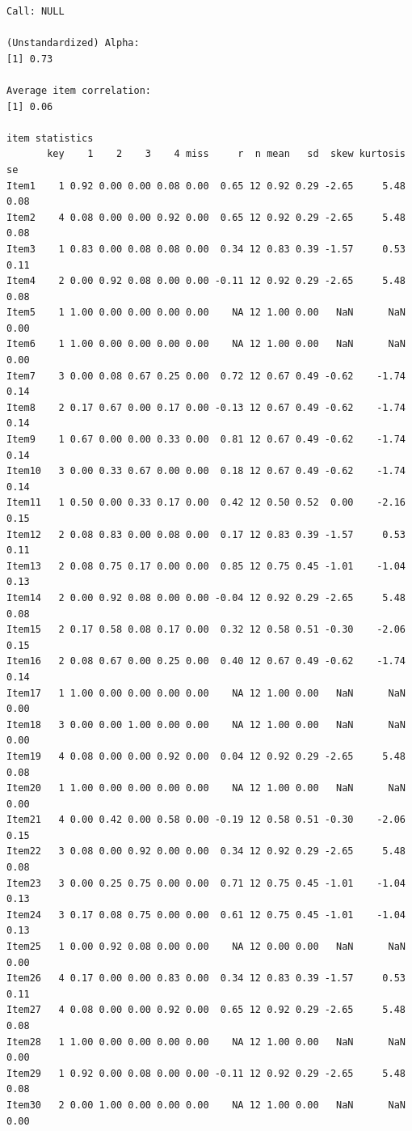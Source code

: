 \documentclass[
  english,
]{book}
\begin{document}
\begin{verbatim}
Call: NULL

(Unstandardized) Alpha:
[1] 0.73

Average item correlation:
[1] 0.06

item statistics 
       key    1    2    3    4 miss     r  n mean   sd  skew kurtosis   se
Item1    1 0.92 0.00 0.00 0.08 0.00  0.65 12 0.92 0.29 -2.65     5.48 0.08
Item2    4 0.08 0.00 0.00 0.92 0.00  0.65 12 0.92 0.29 -2.65     5.48 0.08
Item3    1 0.83 0.00 0.08 0.08 0.00  0.34 12 0.83 0.39 -1.57     0.53 0.11
Item4    2 0.00 0.92 0.08 0.00 0.00 -0.11 12 0.92 0.29 -2.65     5.48 0.08
Item5    1 1.00 0.00 0.00 0.00 0.00    NA 12 1.00 0.00   NaN      NaN 0.00
Item6    1 1.00 0.00 0.00 0.00 0.00    NA 12 1.00 0.00   NaN      NaN 0.00
Item7    3 0.00 0.08 0.67 0.25 0.00  0.72 12 0.67 0.49 -0.62    -1.74 0.14
Item8    2 0.17 0.67 0.00 0.17 0.00 -0.13 12 0.67 0.49 -0.62    -1.74 0.14
Item9    1 0.67 0.00 0.00 0.33 0.00  0.81 12 0.67 0.49 -0.62    -1.74 0.14
Item10   3 0.00 0.33 0.67 0.00 0.00  0.18 12 0.67 0.49 -0.62    -1.74 0.14
Item11   1 0.50 0.00 0.33 0.17 0.00  0.42 12 0.50 0.52  0.00    -2.16 0.15
Item12   2 0.08 0.83 0.00 0.08 0.00  0.17 12 0.83 0.39 -1.57     0.53 0.11
Item13   2 0.08 0.75 0.17 0.00 0.00  0.85 12 0.75 0.45 -1.01    -1.04 0.13
Item14   2 0.00 0.92 0.08 0.00 0.00 -0.04 12 0.92 0.29 -2.65     5.48 0.08
Item15   2 0.17 0.58 0.08 0.17 0.00  0.32 12 0.58 0.51 -0.30    -2.06 0.15
Item16   2 0.08 0.67 0.00 0.25 0.00  0.40 12 0.67 0.49 -0.62    -1.74 0.14
Item17   1 1.00 0.00 0.00 0.00 0.00    NA 12 1.00 0.00   NaN      NaN 0.00
Item18   3 0.00 0.00 1.00 0.00 0.00    NA 12 1.00 0.00   NaN      NaN 0.00
Item19   4 0.08 0.00 0.00 0.92 0.00  0.04 12 0.92 0.29 -2.65     5.48 0.08
Item20   1 1.00 0.00 0.00 0.00 0.00    NA 12 1.00 0.00   NaN      NaN 0.00
Item21   4 0.00 0.42 0.00 0.58 0.00 -0.19 12 0.58 0.51 -0.30    -2.06 0.15
Item22   3 0.08 0.00 0.92 0.00 0.00  0.34 12 0.92 0.29 -2.65     5.48 0.08
Item23   3 0.00 0.25 0.75 0.00 0.00  0.71 12 0.75 0.45 -1.01    -1.04 0.13
Item24   3 0.17 0.08 0.75 0.00 0.00  0.61 12 0.75 0.45 -1.01    -1.04 0.13
Item25   1 0.00 0.92 0.08 0.00 0.00    NA 12 0.00 0.00   NaN      NaN 0.00
Item26   4 0.17 0.00 0.00 0.83 0.00  0.34 12 0.83 0.39 -1.57     0.53 0.11
Item27   4 0.08 0.00 0.00 0.92 0.00  0.65 12 0.92 0.29 -2.65     5.48 0.08
Item28   1 1.00 0.00 0.00 0.00 0.00    NA 12 1.00 0.00   NaN      NaN 0.00
Item29   1 0.92 0.00 0.08 0.00 0.00 -0.11 12 0.92 0.29 -2.65     5.48 0.08
Item30   2 0.00 1.00 0.00 0.00 0.00    NA 12 1.00 0.00   NaN      NaN 0.00

\end{verbatim}
\end{document}
